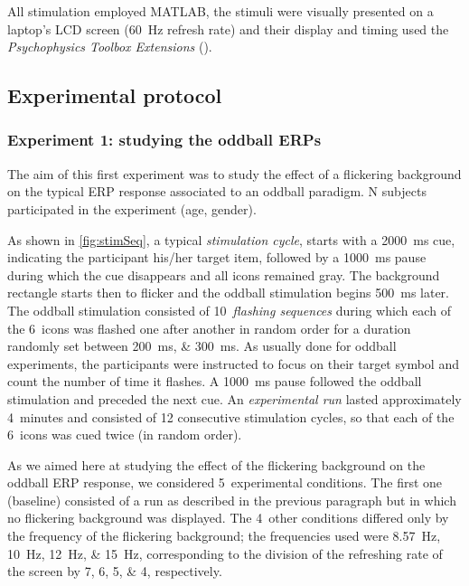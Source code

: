 \documentclass[10pt]{article}
\begin{document}
    All stimulation employed MATLAB\textsuperscript{\textregistered}, the stimuli were visually presented on a laptop's LCD screen (\SI{60}{\Hz} refresh rate) and their display and timing used the \emph{Psychophysics Toolbox Extensions} (\cite{Brainard1997,Pelli1997}).


    \subsection{Experimental protocol}
    \label{sec:2.2Protocol}

        \subsubsection{Experiment 1: studying the oddball \acsp{ERP}}
        \label{sec:2.2.1ProtocolOddball}

        The aim of this first experiment was to study the effect of a flickering background on the typical \ac{ERP} response associated to an oddball paradigm.
        N subjects participated in the experiment (age, gender).

        As shown in \autoref{fig:stimSeq}, a typical \emph{stimulation cycle}, starts with a \SI{2000}{\ms} cue, indicating the participant his/her target item, followed by a \SI{1000}{\ms} pause during which the cue disappears and all icons remained gray.
        The background rectangle starts then to flicker and the oddball stimulation begins \SI{500}{\ms} later.
        The oddball stimulation consisted of 10~\emph{flashing sequences} during which each of the 6~icons was flashed one after another in random order for a duration randomly set between \SIlist[list-units = single]{200;300}{\ms}.
        As usually done for oddball experiments, the participants were instructed to focus on their target symbol and count the number of time it flashes.
        A \SI{1000}{\ms} pause followed the oddball stimulation and preceded the next cue.
        An \emph{experimental run} lasted approximately 4~minutes and consisted of 12 consecutive stimulation cycles, so that each of the 6~icons was cued twice (in random order).

        As we aimed here at studying the effect of the flickering background on the oddball \ac{ERP} response, we considered 5~experimental conditions.
        The first one (baseline) consisted of a run as described in the previous paragraph but in which no flickering background was displayed.
        The 4~other conditions differed only by the frequency of the flickering background; the frequencies used were \SIlist[list-units = single]{8.57;10;12;15}{\Hz}, corresponding to the division of the refreshing rate of the screen by \numlist{7;6;5;4}, respectively.
\end{document}
